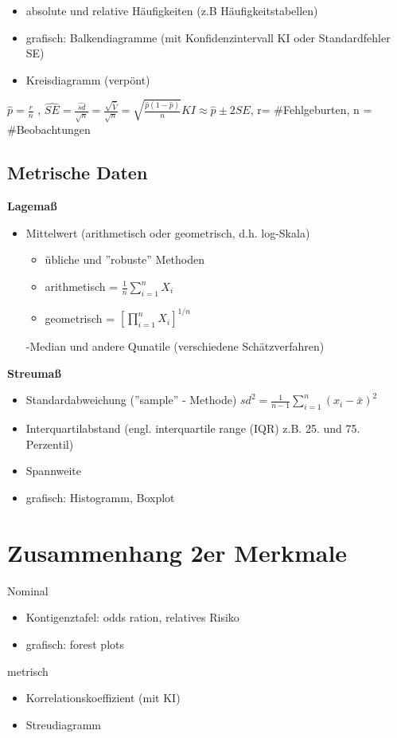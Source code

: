 \documentclass[10pt]{report}
\theoremstyle{definition}
\begin{document}
\begin{itemize}
	\item absolute und relative Häufigkeiten (z.B Häufigkeitstabellen)
	\item grafisch: Balkendiagramme (mit Konfidenzintervall KI oder Standardfehler SE)
	\item Kreisdiagramm (verpönt)
\end{itemize}


$\hat{p} = \frac{r}{n}$ , $\hat{SE} = \frac{\hat{sd}}{\sqrt{n}}= \frac{\sqrt{\hat{V}}}{\sqrt{n}} = \sqrt{\frac{\hat{p} (1- \hat{p})}{n}}
KI \approx \hat{p} \pm 2 SE$, r= \#Fehlgeburten, n = \#Beobachtungen 


\subsection{Metrische Daten}
\textbf{Lagemaß}
\begin{itemize}
	\item Mittelwert (arithmetisch oder geometrisch, d.h. log-Skala)
	\begin{itemize}
		\item übliche und ''robuste'' Methoden
		\item arithmetisch  = $\frac{1}{n}\sum_{i=1}^{n} X_i$
		\item geometrisch  = $[ \prod_{i=1}^{n} X_i]^{1/n}$
	\end{itemize}
	-Median und andere Qunatile (verschiedene Schätzverfahren)
\end{itemize}
\textbf{Streumaß}
\begin{itemize}
	\item Standardabweichung (''sample'' - Methode) $sd^2 = \frac{1}{n-1} \sum_{i=1}^{n}(x_i - \bar{x})^2$
	\item Interquartilabstand (engl. interquartile range (IQR) z.B. 25. und 75. Perzentil)
	\item Spannweite
	\item grafisch: Histogramm, Boxplot	
\end{itemize}

\section{Zusammenhang 2er Merkmale}
Nominal
\begin{itemize}
	\item Kontigenztafel: odds ration, relatives Risiko
	\item grafisch: forest plots
\end{itemize}
metrisch
\begin{itemize}
	\item Korrelationskoeffizient (mit KI)
	\item Streudiagramm
\end{itemize}
\end{document}
